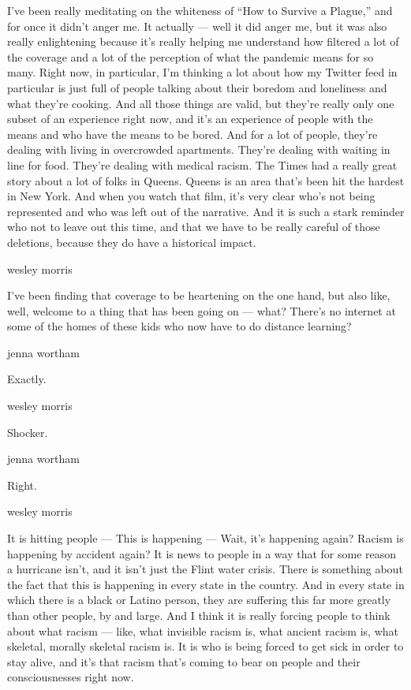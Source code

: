 I've been really meditating on the whiteness of ``How to Survive a
Plague,'' and for once it didn't anger me. It actually --- well it did
anger me, but it was also really enlightening because it's really
helping me understand how filtered a lot of the coverage and a lot of
the perception of what the pandemic means for so many. Right now, in
particular, I'm thinking a lot about how my Twitter feed in particular
is just full of people talking about their boredom and loneliness and
what they're cooking. And all those things are valid, but they're really
only one subset of an experience right now, and it's an experience of
people with the means and who have the means to be bored. And for a lot
of people, they're dealing with living in overcrowded apartments.
They're dealing with waiting in line for food. They're dealing with
medical racism. The Times had a really great story about a lot of folks
in Queens. Queens is an area that's been hit the hardest in New York.
And when you watch that film, it's very clear who's not being
represented and who was left out of the narrative. And it is such a
stark reminder who not to leave out this time, and that we have to be
really careful of those deletions, because they do have a historical
impact.

wesley morris

I've been finding that coverage to be heartening on the one hand, but
also like, well, welcome to a thing that has been going on --- what?
There's no internet at some of the homes of these kids who now have to
do distance learning?

jenna wortham

Exactly.

wesley morris

Shocker.

jenna wortham

Right.

wesley morris

It is hitting people --- This is happening --- Wait, it's happening
again? Racism is happening by accident again? It is news to people in a
way that for some reason a hurricane isn't, and it isn't just the Flint
water crisis. There is something about the fact that this is happening
in every state in the country. And in every state in which there is a
black or Latino person, they are suffering this far more greatly than
other people, by and large. And I think it is really forcing people to
think about what racism --- like, what invisible racism is, what ancient
racism is, what skeletal, morally skeletal racism is. It is who is being
forced to get sick in order to stay alive, and it's that racism that's
coming to bear on people and their consciousnesses right now.

